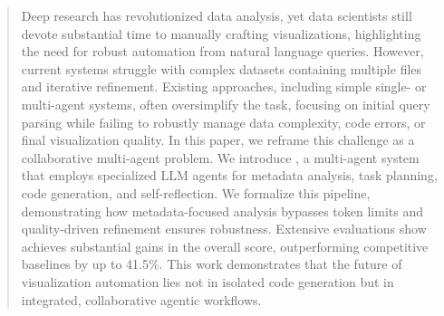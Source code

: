 \begin{abstract}
Deep research has revolutionized data analysis, yet data scientists still devote substantial time to manually crafting visualizations, highlighting the need for robust automation from natural language queries. However, 
current systems struggle with complex datasets containing multiple files and iterative refinement. 
Existing approaches, including simple single- or multi-agent systems, often oversimplify the task, focusing on initial query parsing while failing to robustly manage data complexity, code errors, or final visualization quality. 
In this paper, we reframe this challenge as a collaborative multi-agent problem. 
We introduce \methodname{}, a multi-agent system that employs specialized LLM agents for metadata analysis, task planning, code generation, and self-reflection. 
We formalize this pipeline, demonstrating how metadata-focused analysis bypasses token limits and quality-driven refinement ensures robustness. 
Extensive evaluations show \methodname{} achieves substantial gains in the overall score, outperforming competitive baselines by up to 41.5\%.
This work demonstrates that the future of visualization automation lies not in isolated code generation but in integrated, collaborative agentic workflows.

\end{abstract}